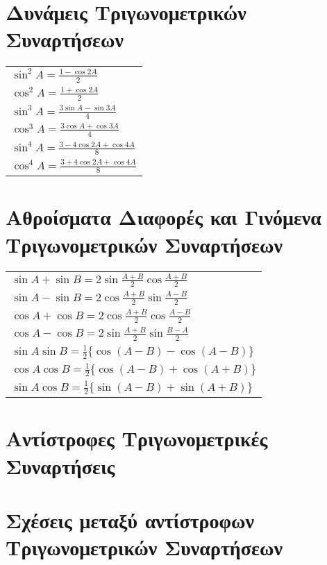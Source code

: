 \section{Δυνάμεις Τριγωνομετρικών Συναρτήσεων}

\begin{tabular}{l}
    $ \sin^{2}{A} = \frac{1 - \cos{2A}}{2} $ \\
    $ \cos^{2}{A} = \frac{1 + \cos{2A}}{2} $ \\
    $ \sin^{3}{A} = \frac{3 \sin{A} - \sin{3A}}{4} $ \\
    $ \cos^{3}{A} = \frac{3 \cos{A} + \cos{3A}}{4} $ \\
    $ \sin^{4}{A} = \frac{3 - 4 \cos{2A} + \cos{4A}}{8} $ \\
    $ \cos^{4}{A} = \frac{3 + 4 \cos{2A} + \cos{4A}}{8} $ 
\end{tabular}


\section{Aθροίσματα Διαφορές και Γινόμενα Τριγωνομετρικών Συναρτήσεων}  
   \begin{tabular}{l}
       $ \sin{A} + \sin{B} =2 \sin{\frac{A + B}{2} \cos{\frac{A + B}{2}}}  $ \\ 
       $ \sin{A} - \sin{B} = 2 \cos{\frac{A + B}{2}} \sin{\frac{A - B}{2}}  $ \\        
       $ \cos{A} + \cos{B} = 2 \cos{\frac{A + B}{2}} \cos{\frac{A - B}{2}}  $ \\
       $ \cos{A} - \cos{B} = 2 \sin{\frac{A + B}{2} \sin{\frac{B - A}{2}}} $ \\
       $ \sin{A} \sin{B} = \frac{1}{2} \{\cos{(A-B)} - \cos{(A-B)}\} $ \\
       $ \cos{A} \cos{B} = \frac{1}{2} \{\cos{(A-B)} + \cos{(A+B)}\} $ \\
       $ \sin{A} \cos{B} = \frac{1}{2} \{\sin{(A-B)} + \sin{(A+B)}\} $ 
   \end{tabular} 

   \section{Αντίστροφες Τριγωνομετρικές Συναρτήσεις}

   \section{Σχέσεις μεταξύ αντίστροφων Τριγωνομετρικών Συναρτήσεων}


